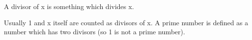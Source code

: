 A divisor of x is something which divides x.
\par
Usually 1 and x itself are counted as divisors of x.
A prime number is defined as a number which has two 
divisors (so 1 is not a prime number).